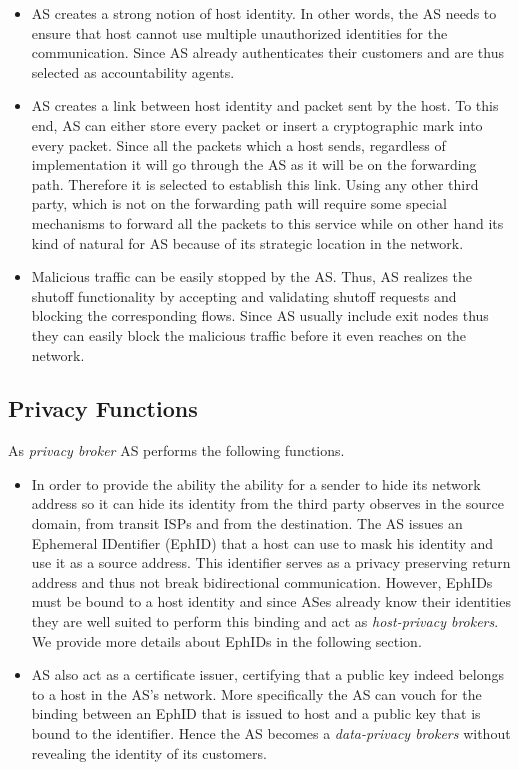 \begin{itemize}
    \item  AS creates a strong notion of host identity. In other words, the AS needs to ensure that host cannot use multiple unauthorized identities for the communication. Since AS already authenticates their customers and are thus selected as accountability agents.
    \item AS creates a link between host identity and packet sent by the host. To this end, AS can either store every packet or insert a cryptographic mark into every packet. Since all the packets which a host sends, regardless of implementation it will go through the AS as it will be on the forwarding path. Therefore it is selected to establish this link. Using any other third party, which is not on the forwarding path will require some special mechanisms to forward all the packets to this service while on other hand its kind of natural for AS because of its strategic location in the network.
    \item Malicious traffic can be easily stopped by the AS. Thus, AS realizes the shutoff functionality by accepting and validating shutoff requests and blocking the corresponding flows. Since AS usually include exit nodes thus they can easily block the malicious traffic before it even reaches on the network.
\end{itemize}

\subsection{Privacy Functions} As \textit{privacy broker} AS performs the following functions.

\begin{itemize}
    \item In order to provide the ability the ability for a sender to hide its network address so it can hide its identity from the third party observes in the source domain, from transit ISPs and from the destination. The AS issues an Ephemeral IDentifier (EphID) that a host can use to mask his identity and use it as a source address. This identifier serves as a privacy preserving return address and thus not break bidirectional communication. However, EphIDs must be bound to a host identity and since ASes already know their identities they are well suited to perform this binding and act as \textit{host-privacy brokers}. We provide more details about EphIDs in the following section.
    \item AS also act as a certificate issuer, certifying that a public key indeed belongs to a host in the AS's network. More specifically the AS can vouch for the binding between an EphID that is issued to host and a public key that is bound to the identifier. Hence the AS becomes a \textit{data-privacy brokers} without revealing the identity of its customers.
\end{itemize}

